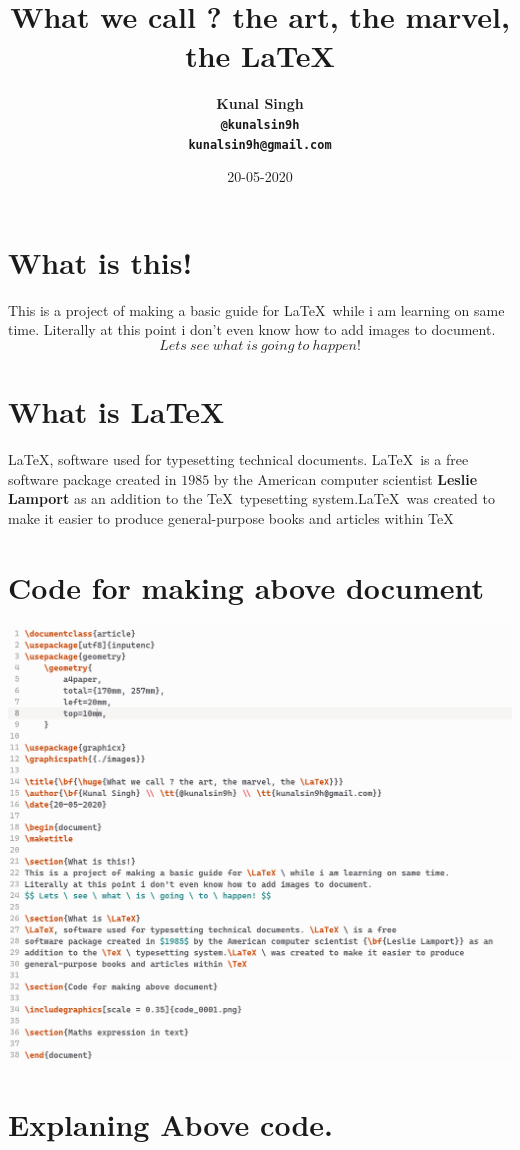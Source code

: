 \documentclass{article}
\title{\bf{\huge{What we call ? the art, the marvel, the \LaTeX}}}
\author{\bf{Kunal Singh} \\ \tt{@kunalsin9h} \\ \tt{kunalsin9h@gmail.com}}
\date{20-05-2020}
\begin{document}
\maketitle

\section{What is this!}
This is a project of making a basic guide for \LaTeX \ while i am learning on same time.
Literally at this point i don't even know how to add images to document.
$$ Lets \ see \ what \ is \ going \ to \ happen! $$

\section{What is \LaTeX}
\LaTeX, software used for typesetting technical documents. \LaTeX \ is a free
software package created in $1985$ by the American computer scientist {\bf{Leslie Lamport}} as an
addition to the \TeX \ typesetting system.\LaTeX \ was created to make it easier to produce
general-purpose books and articles within \TeX

\section{Code for making above document}

\includegraphics[scale = 0.35]{code_0001.png}

\section{Explaning Above code.}
\end{document}
